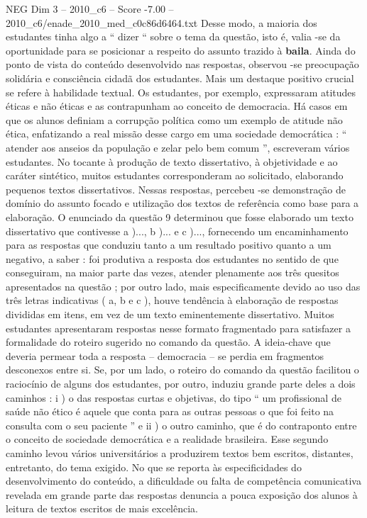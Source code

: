 \begin{textsample}{NEG Dim 3 – 2010\_c6 – Score -7.00 – 2010\_c6/enade\_2010\_med\_c0c86d6464.txt}
Desse modo, a maioria dos estudantes tinha algo a “ dizer “ sobre o tema da questão, isto é, valia -se da oportunidade para se posicionar a respeito do assunto trazido à \textbf{baila}.
Ainda do ponto de vista do conteúdo desenvolvido nas respostas, observou -se preocupação solidária e consciência cidadã dos estudantes.
Mais um destaque positivo crucial se refere à habilidade textual.
Os estudantes, por exemplo, expressaram atitudes éticas e não éticas e as contrapunham ao conceito de democracia.
Há casos em que os alunos definiam a corrupção política como um exemplo de atitude não ética, enfatizando a real missão desse cargo em uma sociedade democrática : “ atender aos anseios da população e zelar pelo bem comum ”, escreveram vários estudantes.
No tocante à produção de texto dissertativo, à objetividade e ao caráter sintético, muitos estudantes corresponderam ao solicitado, elaborando pequenos textos dissertativos.
Nessas respostas, percebeu -se demonstração de domínio do assunto focado e utilização dos textos de referência como base para a elaboração.
O enunciado da questão 9 determinou que fosse elaborado um texto dissertativo que contivesse a )..., b )... e c )..., fornecendo um encaminhamento para as respostas que conduziu tanto a um resultado positivo quanto a um negativo, a saber : foi produtiva a resposta dos estudantes no sentido de que conseguiram, na maior parte das vezes, atender plenamente aos três quesitos apresentados na questão ; por outro lado, mais especificamente devido ao uso das três letras indicativas ( a, b e c ), houve tendência à elaboração de respostas divididas em itens, em vez de um texto eminentemente dissertativo.
Muitos estudantes apresentaram respostas nesse formato fragmentado para satisfazer a formalidade do roteiro sugerido no comando da questão.
A ideia-chave que deveria permear toda a resposta – democracia – se perdia em fragmentos desconexos entre si.
Se, por um lado, o roteiro do comando da questão facilitou o raciocínio de alguns dos estudantes, por outro, induziu grande parte deles a dois caminhos : i ) o das respostas curtas e objetivas, do tipo “ um profissional de saúde não ético é aquele que conta para as outras pessoas o que foi feito na consulta com o seu paciente ” e ii ) o outro caminho, que é do contraponto entre o conceito de sociedade democrática e a realidade brasileira.
Esse segundo caminho levou vários universitários a produzirem textos bem escritos, distantes, entretanto, do tema exigido.
No que se reporta às especificidades do desenvolvimento do conteúdo, a dificuldade ou falta de competência comunicativa revelada em grande parte das respostas denuncia a pouca exposição dos alunos à leitura de textos escritos de mais excelência.

\end{textsample}
